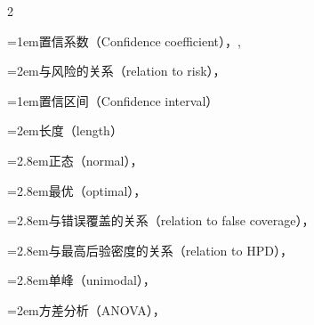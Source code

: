\begin{multicols}{2}
\par\addvspace{2pt}
\par\noindent\hangindent=1em\hspace*{0em}\label{idx:127}置信系数（Confidence coefficient），\hyperref[def:9.1.5]{\pageref*{def:9.1.5}}, \hyperref[idxocc:127:387]{\pageref*{idxocc:127:387}}\par
\par\noindent\hangindent=2em\hspace*{1em}\label{idx:128}与风险的关系（relation to risk），\hyperref[idxocc:128:395]{\pageref*{idxocc:128:395}}\par
\par\addvspace{2pt}
\par\noindent\hangindent=1em\hspace*{0em}\label{idx:129}置信区间（Confidence interval）\par
{}
\par\noindent\hangindent=2em\hspace*{1em}\label{idx:130}长度（length）\par
\par\noindent\hangindent=2.8em\hspace*{1.8em}\label{idx:131}正态（normal），\hyperref[ex:9.3.3]{\pageref*{ex:9.3.3}}\par
\par\noindent\hangindent=2.8em\hspace*{1.8em}\label{idx:132}最优（optimal），\hyperref[thm:9.3.2]{\pageref*{thm:9.3.2}}\par
\par\noindent\hangindent=2.8em\hspace*{1.8em}\label{idx:133}与错误覆盖的关系（relation to false coverage），\hyperref[thm:9.3.9]{\pageref*{thm:9.3.9}}\par
\par\noindent\hangindent=2.8em\hspace*{1.8em}\label{idx:134}与最高后验密度的关系（relation to HPD），\hyperref[idxocc:134:389]{\pageref*{idxocc:134:389}}\par
\par\noindent\hangindent=2.8em\hspace*{1.8em}\label{idx:135}单峰（unimodal），\hyperref[thm:9.3.2]{\pageref*{thm:9.3.2}}\par
\par\noindent\hangindent=2em\hspace*{1em}\label{idx:136}方差分析（ANOVA），\hyperref[eq:11.2.8]{\pageref*{eq:11.2.8}}\par

\end{multicols}
